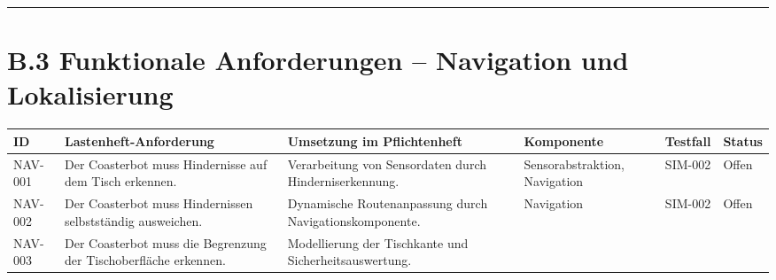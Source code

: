 \documentclass[
]{article}
\begin{document}
\begin{center}\rule{0.5\linewidth}{0.5pt}\end{center}

\section{B.3 Funktionale Anforderungen -- Navigation und
Lokalisierung}\label{b.3-funktionale-anforderungen-navigation-und-lokalisierung}

\begin{longtable}[]{@{}
  >{\raggedright\arraybackslash}p{}
  >{\raggedright\arraybackslash}p{}
  >{\raggedright\arraybackslash}p{}
  >{\raggedright\arraybackslash}p{}
  >{\raggedright\arraybackslash}p{}
  >{\raggedright\arraybackslash}p{}@{}}
\toprule\noalign{}
\begin{minipage}[b]{\linewidth}\raggedright
ID
\end{minipage} & \begin{minipage}[b]{\linewidth}\raggedright
Lastenheft-Anforderung
\end{minipage} & \begin{minipage}[b]{\linewidth}\raggedright
Umsetzung im Pflichtenheft
\end{minipage} & \begin{minipage}[b]{\linewidth}\raggedright
Komponente
\end{minipage} & \begin{minipage}[b]{\linewidth}\raggedright
Testfall
\end{minipage} & \begin{minipage}[b]{\linewidth}\raggedright
Status
\end{minipage} \\
\midrule\noalign{}
\endhead
\bottomrule\noalign{}
\endlastfoot
NAV-001 & Der Coasterbot muss Hindernisse auf dem Tisch erkennen. &
Verarbeitung von Sensordaten durch Hinderniserkennung. &
Sensorabstraktion, Navigation & SIM-002 & Offen \\
NAV-002 & Der Coasterbot muss Hindernissen selbstständig ausweichen. &
Dynamische Routenanpassung durch Navigationskomponente. & Navigation &
SIM-002 & Offen \\
NAV-003 & Der Coasterbot muss die Begrenzung der Tischoberfläche
erkennen. & Modellierung der Tischkante und Sicherheitsauswertung. &

\end{longtable}
\end{document}
